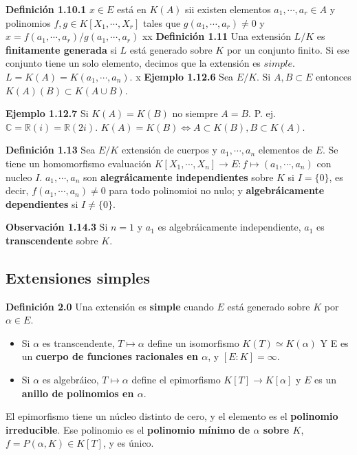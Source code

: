 \documentclass[a4paper, 11pt]{extarticle}
\newcommand{\defi}[1]{\textcolor{azul}{\textbf{Definición #1}}}
\newcommand{\obs}[1]{\textcolor{verde}{\textbf{Observación #1}}}
\newcommand{\ejem}[1]{\textcolor{verde}{\textbf{Ejemplo #1}}}
\begin{document}
\begin{multicols*}{2}
\defi{1.10.1} \(x \in E\) está en \(K(A)\) sii existen elementos \(a_1,
\cdots, a_r \in A\) y polinomios \(f,g \in K[X_1, \cdots, X_r]\) tales que \(g(a_1, \cdots, a_r) \neq 0\) y \(x = f(a_1, \cdots, a_r)/g(a_1, \cdots, a_r)\)
xx
\defi{1.11} Una extensión \(L/K\) es \textbf{finitamente generada} si \(L\) está
generado sobre \(K\) por un conjunto finito. Si ese conjunto tiene un solo
elemento, decimos que la extensión es \(simple\).
\(L = K(A) = K(a_1, \cdots, a_n)\).
x
\ejem{1.12.6} Sea \(E/K\). Si \(A,B \subset E\) entonces \(K(A)(B) \subset
K(A \cup B)\).

\ejem{1.12.7} Si \(K(A) = K(B)\) no siempre \(A = B\). P. ej. \(\mathbb{C}
= \mathbb{R}(i) = \mathbb{R}(2i)\). \(K(A) = K(B) \iff A \subset K(B), B
\subset K(A)\).

\defi{1.13} Sea \(E/K\) extensión de cuerpos y \(a_1, \cdots, a_n\)
elementos de \(E\). Se tiene un homomorfismo evaluación \(K[X_1, \cdots, X_n]
\rightarrow  E: f \mapsto (a_1, \cdots, a_n)\) con nucleo \(I\). \(a_1,
\cdots, a_n\) son \textbf{alegráicamente independientes} sobre \(K\) si \(I = \{ 0 \}\), es decir,  \(f(a_1, \cdots, a_n) \neq 0\) para todo polinomioi no nulo; y
\textbf{algebráicamente dependientes} si \(I \neq \{ 0 \}\).

\obs{1.14.3} Si \(n = 1\) y \(a_1\) es algebráicamente independiente, \(a_1\) es \textbf{transcendente} sobre \(K\).



\vspace{-1.5em}
\subsection*{Extensiones simples}
\label{sec:orgf7df71c}
\vspace{-1.5em}
\defi{2.0} Una extensión es \textbf{simple} cuando \(E\) está generado sobre \(K\)
por \(\alpha \in E\).  
\begin{itemize}
\item Si \(\alpha\) es transcendente, \(T \mapsto \alpha\) define un isomorfismo \(K(T) \simeq K(\alpha)\) Y E es un \textbf{cuerpo de funciones racionales en \(\alpha\)}, y \([E:K] = \infty\).
\item Si \(\alpha\) es algebráico, \(T \mapsto \alpha\) define el epimorfismo
\(K[T] \rightarrow  K[\alpha]\) y \(E\) es un \textbf{anillo de polinomios en \(\alpha\)}.
\end{itemize}
El epimorfismo tiene un núcleo distinto de cero, y el elemento es el \textbf{polinomio
irreducible}. Ese polinomio es el \textbf{polinomio mínimo de \(\alpha\) sobre \(K\)},
\(f = P(\alpha, K) \in K[T]\), y es único.


\end{multicols*}
\end{document}
